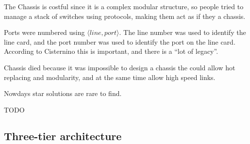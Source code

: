 The Chassis is costful since it is a complex modular structure, so people tried to manage a stack of switches using protocols, making them act as if they a chassis.

Ports were numbered using $\langle line , port\rangle$. The line number was used to identify the line card, and the port number was used to identify the port on the line card. According to Cisternino this is important, and there is a ``lot of legacy''.

Chassis died because it was impossible to design a chassis the could allow hot replacing and modularity, and at the same time allow high speed links.

Nowdays star solutions are rare to find.

TODO

\subsection{Three-tier architecture}
